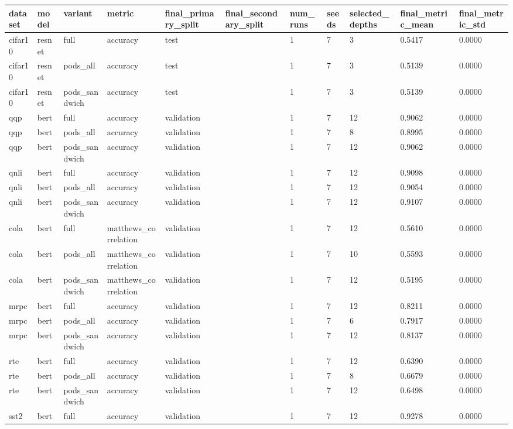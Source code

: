 \begin{tabular}{lllllllllll}
\hline
dataset & model & variant & metric & final\_primary\_split & final\_secondary\_split & num\_runs & seeds & selected\_depths & final\_metric\_mean & final\_metric\_std \\
\hline
cifar10 & resnet & full & accuracy & test &  & 1 & 7 & 3 & 0.5417 & 0.0000 \\
cifar10 & resnet & pods\_all & accuracy & test &  & 1 & 7 & 3 & 0.5139 & 0.0000 \\
cifar10 & resnet & pods\_sandwich & accuracy & test &  & 1 & 7 & 3 & 0.5139 & 0.0000 \\
qqp & bert & full & accuracy & validation &  & 1 & 7 & 12 & 0.9062 & 0.0000 \\
qqp & bert & pods\_all & accuracy & validation &  & 1 & 7 & 8 & 0.8995 & 0.0000 \\
qqp & bert & pods\_sandwich & accuracy & validation &  & 1 & 7 & 12 & 0.9062 & 0.0000 \\
qnli & bert & full & accuracy & validation &  & 1 & 7 & 12 & 0.9098 & 0.0000 \\
qnli & bert & pods\_all & accuracy & validation &  & 1 & 7 & 12 & 0.9054 & 0.0000 \\
qnli & bert & pods\_sandwich & accuracy & validation &  & 1 & 7 & 12 & 0.9107 & 0.0000 \\
cola & bert & full & matthews\_correlation & validation &  & 1 & 7 & 12 & 0.5610 & 0.0000 \\
cola & bert & pods\_all & matthews\_correlation & validation &  & 1 & 7 & 10 & 0.5593 & 0.0000 \\
cola & bert & pods\_sandwich & matthews\_correlation & validation &  & 1 & 7 & 12 & 0.5195 & 0.0000 \\
mrpc & bert & full & accuracy & validation &  & 1 & 7 & 12 & 0.8211 & 0.0000 \\
mrpc & bert & pods\_all & accuracy & validation &  & 1 & 7 & 6 & 0.7917 & 0.0000 \\
mrpc & bert & pods\_sandwich & accuracy & validation &  & 1 & 7 & 12 & 0.8137 & 0.0000 \\
rte & bert & full & accuracy & validation &  & 1 & 7 & 12 & 0.6390 & 0.0000 \\
rte & bert & pods\_all & accuracy & validation &  & 1 & 7 & 8 & 0.6679 & 0.0000 \\
rte & bert & pods\_sandwich & accuracy & validation &  & 1 & 7 & 12 & 0.6498 & 0.0000 \\
sst2 & bert & full & accuracy & validation &  & 1 & 7 & 12 & 0.9278 & 0.0000 \\

\end{tabular}
